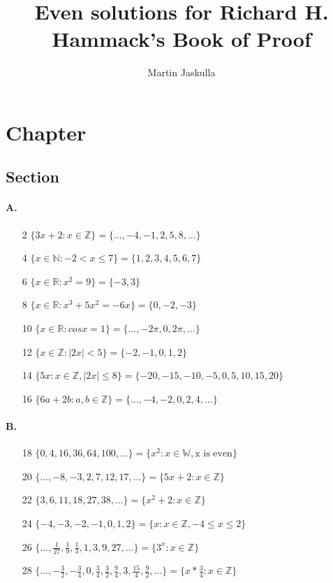 \documentclass{article}
\title{Even solutions for Richard H. Hammack's Book of Proof}
\author{Martin Jaskulla}
\begin{document}
\maketitle
\section{Chapter}
\subsection{Section}
\paragraph{A.}
\begin{enumerate}
    \item [2] $\{3x+2:x \in \mathbb{Z} \} = \{...,-4,-1,2,5,8,...\}$
    \item [4] $\{x \in \mathbb{N}: -2 < x \leq 7 \} =\{1,2,3,4,5,6,7\}$
    \item [6] $\{x \in \mathbb{R}: x^2=9 \} =\{-3,3\}$
    \item [8] $\{x \in \mathbb{R}:x^3+5x^2=-6x \} =\{0,-2,-3\}$
    \item [10] $\{x \in \mathbb{R}: cos x = 1 \} =\{...,-2\pi,0,2\pi,...\}$
    \item [12] $\{x \in \mathbb{Z}: |2x|<5 \} =\{-2,-1,0,1,2\}$
    \item [14] $\{5x: x \in \mathbb{Z}, |2x| \leq8 \} =\{-20,-15,-10,-5,0,5,10,15,20\}$
    \item [16] $\{6a+2b: a,b \in \mathbb{Z} \} =\{...,-4,-2,0,2,4,...\}$
\end{enumerate}
\paragraph{B.}
\begin{enumerate}
    \item [18] $\{0,4,16,36,64,100,...\} = \{x^2: x \in \mathbb{W}, \text{x is even}\}$
    \item [20] $\{...,-8,-3,2,7,12,17,...\} = \{5x+2: x \in \mathbb{Z}\}$
    \item [22] $\{3,6,11,18,27,38,...\} = \{x^2+2:x\in \mathbb{Z}\}$
    \item [24] $\{-4,-3,-2,-1,0,1,2\} = \{ x: x\in \mathbb{Z}, -4 \leq x \leq 2\}$
    \item [26] $\{...,\frac{1}{27},\frac{1}{9},\frac{1}{3},1,3,9,27,...\} = \{ 3^x: x \in \mathbb{Z}\}$
    \item [28] $\{...,-\frac{3}{2},-\frac{3}{4},0,\frac{3}{4},\frac{3}{2},\frac{9}{4},3,\frac{15}{4},\frac{9}{2},...\} =\{x * \frac{3}{4}:x \in \mathbb{Z}\}$
\end{enumerate}
\end{document}
